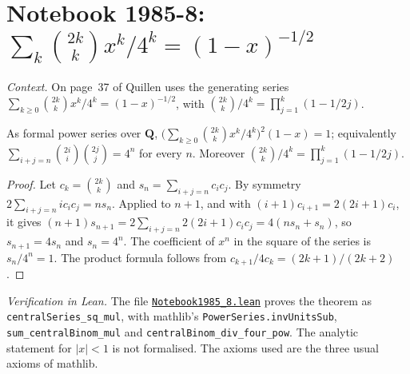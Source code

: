 \section[Notebook 1985-8: the series of $(1 - x)^{-1/2}$]{Notebook 1985-8: $\sum_k \binom{2k}{k}x^k/4^k = (1 - x)^{-1/2}$\protect{}}\label{sec:quillen-1985-8}

\emph{Context.} On page~37 of  Quillen uses the generating series $\sum_{k \ge 0}\binom{2k}{k}x^k/4^k = (1 - x)^{-1/2}$, with $\binom{2k}{k}/4^k = \prod_{j=1}^k(1 - 1/2j)$.

\begin{encadre}
\begin{theoreme}\label{thm:quillen-1985-8}
As formal power series over $\mathbf Q$, $\bigl(\sum_{k \ge 0}\binom{2k}{k}x^k/4^k\bigr)^2(1 - x) = 1$; equivalently $\sum_{i+j=n}\binom{2i}{i}\binom{2j}{j} = 4^n$ for every $n$. Moreover $\binom{2k}{k}/4^k = \prod_{j=1}^k(1 - 1/2j)$.
\end{theoreme}
\end{encadre}

\begin{proof}
Let $c_k = \binom{2k}{k}$ and $s_n = \sum_{i+j=n}c_ic_j$. By symmetry $2\sum_{i+j=n}ic_ic_j = ns_n$. Applied to $n + 1$, and with $(i+1)c_{i+1} = 2(2i+1)c_i$, it gives $(n+1)s_{n+1} = 2\sum_{i+j=n}2(2i+1)c_ic_j = 4(ns_n + s_n)$, so $s_{n+1} = 4s_n$ and $s_n = 4^n$. The coefficient of $x^n$ in the square of the series is $s_n/4^n = 1$. The product formula follows from $c_{k+1}/4c_k = (2k+1)/(2k+2)$.
\end{proof}

\emph{Verification in Lean.} The file \href{\leanblobmain/Notebook1985_8.lean}{\texttt{Notebook1985\_8.\allowbreak{}lean}} proves the theorem as \texttt{centralSeries\_sq\_mul}, with mathlib's \texttt{PowerSeries.invUnitsSub}, \texttt{sum\_centralBinom\_mul} and \texttt{centralBinom\_div\_four\_pow}. The analytic statement for $|x| < 1$ is not formalised. The axioms used are the three usual axioms of mathlib.

